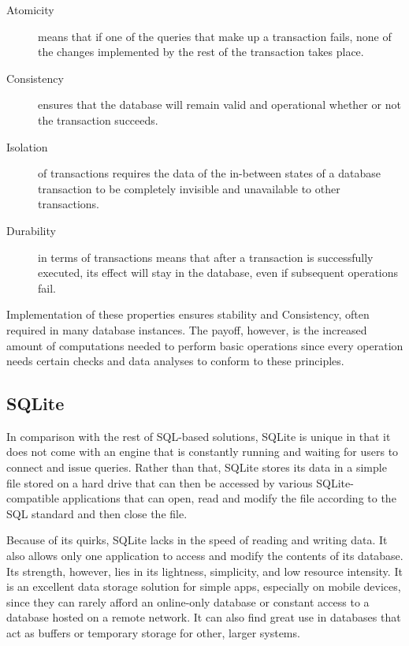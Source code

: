 \begin{description}
  \item[Atomicity] means that if one of the queries that make up a transaction fails, none of the changes implemented by the rest of the transaction takes place.
  \item[Consistency] ensures that the database will remain valid and operational whether or not the transaction succeeds.
  \item[Isolation] of transactions requires the data of the in-between states of a database transaction to be completely invisible and unavailable to other transactions.
  \item[Durability] in terms of transactions means that after a transaction is successfully executed, its effect will stay in the database, even if subsequent operations fail.
\end{description}
\par Implementation of these properties ensures stability and Consistency, often required in many database instances. The payoff, however, is the increased amount of computations needed to perform basic operations since every operation needs certain checks and data analyses to conform to these principles.

%
\subsection{SQLite}
\label{subsec:background:first_seciton:first_subsection}
\par In comparison with the rest of SQL-based solutions, SQLite is unique in that it does not come with an engine that is constantly running and waiting for users to connect and issue queries. Rather than that, SQLite stores its data in a simple file stored on a hard drive that can then be accessed by various SQLite-compatible applications that can open, read and modify the file according to the SQL standard and then close the file\citep{OwensSQLite}.

\par Because of its quirks, SQLite lacks in the speed of reading and writing data. It also allows only one application to access and modify the contents of its database. Its strength, however, lies in its lightness, simplicity, and low resource intensity. It is an excellent data storage solution for simple apps, especially on mobile devices, since they can rarely afford an online-only database or constant access to a database hosted on a remote network. It can also find great use in databases that act as buffers or temporary storage for other, larger systems\citep{OwensSQLite}.

